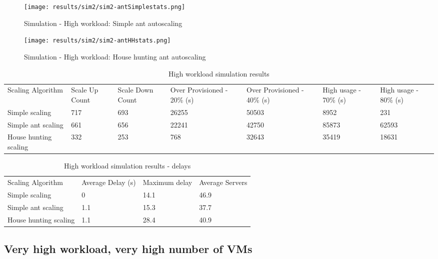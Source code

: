 \begin{figure}
	\centering
		\texttt{[image: results/sim2/sim2-antSimplestats.png]}
	\caption{Simulation - High workload: Simple ant autoscaling}
	\label{fig:sim2-antSimplestats}
\end{figure}

\begin{figure}
	\centering
		\texttt{[image: results/sim2/sim2-antHHstats.png]}
	\caption{Simulation - High workload: House hunting ant autoscaling}
	\label{fig:sim2-antHHstats}
\end{figure}

\begin{table}
\caption{High workload simulation results}
\label{table:sim2}
\begin{tabu} to\linewidth{|X[c]|X[c]|X[c]|X[c]|X[c]|X[c]|X[c]|}
\everyrow{\hline}
\hline
Scaling Algorithm & Scale Up Count & Scale Down Count & Over Provisioned - 20\% (s) & Over Provisioned - 40\% (s) & High usage - 70\% (s) & High usage - 80\% (s) \\
Simple scaling & 717 & 693 & 26255 & 50503 & 8952 & 231 \\
Simple ant scaling & 661 & 656 & 22241 & 42750 & 85873 & 62593 \\
House hunting scaling & 332 & 253 & 768 & 32643 & 35419 & 18631 \\
\end{tabu}
\end{table}

\begin{table}
\caption{High workload simulation results - delays}
\label{table:sim2-delay}
\begin{tabu} to\linewidth{|X[c]|X[c]|X[c]|X[c]|}
\everyrow{\hline}
\hline
Scaling Algorithm & Average Delay (s) & Maximum delay & Average Servers  \\
Simple scaling & 0 & 14.1 & 46.9 \\
Simple ant scaling & 1.1 & 15.3 & 37.7 \\
House hunting scaling & 1.1 & 28.4 & 40.9 \\
\end{tabu}
\end{table}

\subsection{Very high workload, very high number of VMs}

